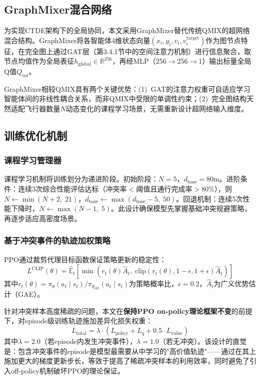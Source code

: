 \documentclass[12pt,a4paper,UTF8]{ctexart}
\begin{document}
\subsection{GraphMixer混合网络}

为实现CTDE架构下的全局协同，本文采用GraphMixer替代传统QMIX的超网络混合结构\cite{ref11}。GraphMixer将各智能体4维状态向量$(x_i, y_i, v_i, v_i^{\text{target}})$作为图节点特征，在完全图上通过GAT层（第3.4.1节中的空间注意力机制）进行信息聚合，取节点均值作为全局表征$h_{\text{global}} \in \mathbb{R}^{256}$，再经MLP（256$\to$256$\to$1）输出标量全局Q值$Q_{\text{tot}}$。

GraphMixer相较QMIX具有两个关键优势：(1)~GAT的注意力权重可自适应学习智能体间的非线性耦合关系，而非QMIX中受限的单调性约束；(2)~完全图结构天然适配飞行器数量$N$动态变化的课程学习场景，无需重新设计超网络输入维度。

\subsection{训练优化机制}

\subsubsection{课程学习管理器}

课程学习机制将训练划分为递进阶段。初始阶段：$N=5$，$d_{\text{base}}=80\text{m}$。进阶条件：连续3次综合性能评估达标（冲突率$<$阈值且通行完成率$>80\%$），则$N \leftarrow \min(N+2,\; 21)$，$d_{\text{base}} \leftarrow \max(d_{\text{base}}-5,\; 50)$。回退机制：连续5次性能下降时，$N \leftarrow \max(N-1,\; 5)$。此设计确保模型先掌握基础冲突规避策略，再逐步适应高密度场景。

\subsubsection{基于冲突事件的轨迹加权策略}

PPO通过裁剪代理目标函数保证策略更新的稳定性\cite{ref11,ref17}：
\begin{equation}
    L^{\text{CLIP}}(\theta) = \hat{\mathbb{E}}_t\left[\min\left(r_t(\theta)\hat{A}_t,\; \text{clip}(r_t(\theta), 1-\epsilon, 1+\epsilon)\hat{A}_t\right)\right]
    \label{eq:ppo_clip}
\end{equation}
其中$r_t(\theta) = \pi_\theta(a_t \mid s_t) / \pi_{\theta_{\text{old}}}(a_t \mid s_t)$为策略概率比，$\epsilon = 0.2$，$\hat{A}_t$为广义优势估计（GAE）。

针对冲突样本高度稀疏的问题，本文在\textbf{保持PPO on-policy理论框架不变}的前提下，对episode级训练轨迹施加差异化损失权重：
\begin{equation}
    L_{\text{total}} = \lambda \cdot \left(L_{\text{policy}} + L_{q} + 0.5 \cdot L_{\text{value}}\right)
    \label{eq:weighted_loss}
\end{equation}
其中$\lambda = 2.0$（若episode内发生冲突事件），$\lambda = 1.0$（若无冲突）。该设计的直觉是：包含冲突事件的episode是模型最需要从中学习的"高价值轨迹"——通过在其上施加更大的梯度更新步长，等效于提高了稀疏冲突样本的利用效率，同时避免了引入off-policy机制破坏PPO的理论保证。
\end{document}
